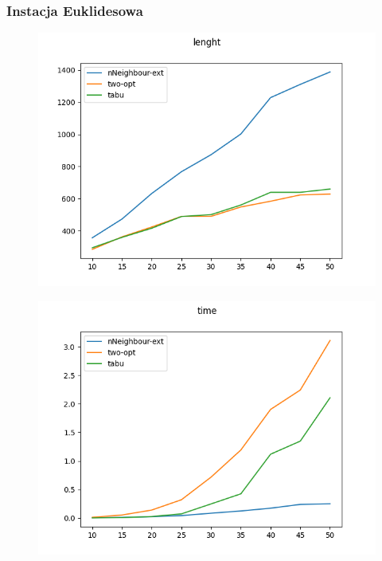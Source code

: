 \documentclass[11pt]{article}
\begin{document}
    \subsubsection{Instacja Euklidesowa}
    \begin{center}
        \begin{figure}[H]
            \includegraphics[scale=0.50]{euc2dLen.png}
        \end{figure}
    \end{center}
    \begin{center}
        \begin{figure}[H]
            \includegraphics[scale=0.50]{euc2dTime.png}\\
        \end{figure}
    \end{center}
\end{document}

